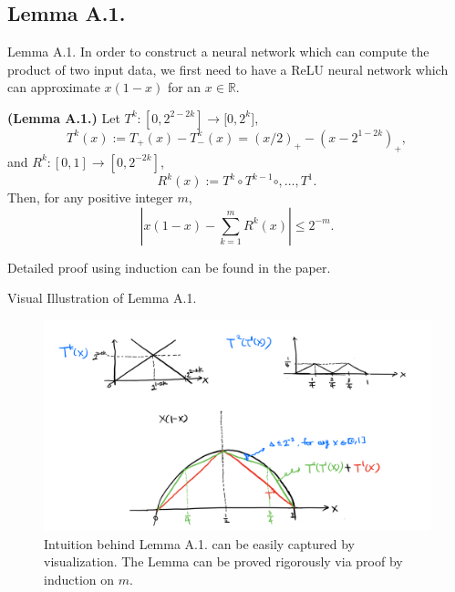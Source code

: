 \documentclass{if-beamer}
\begin{document}
\subsection{Lemma A.1.}
\begin{frame}{Lemma A.1.}
    In order to construct a neural network which can compute the product of two input data, we first need to have a ReLU neural network which can approximate $x(1-x)$ for an $x\in\mathbb{R}$.
    \begin{tcolorbox}
    \textbf{(Lemma A.1.)}
    Let $T^{k}:[0,2^{2-2k}]\rightarrow{[0,2^{k}}]$,
    \begin{equation*}
        T^{k}(x) := T_{+}(x) - T_{-}^{k}(x) = (x/2)_{+} - (x-2^{1-2k})_{+},
    \end{equation*}
    and $R^{k}:[0,1]\rightarrow{[0,2^{-2k}]}$,
    \begin{equation*}
        R^{k}(x) := T^{k}\circ T^{k-1} \circ, \dots, T^{1}.
    \end{equation*}
    Then, for any positive integer $m$,
    \begin{equation*}
        \left| x(1-x) - \sum_{k=1}^{m} R^{k}(x) \right| \leq 2^{-m}.
    \end{equation*}
    
    \end{tcolorbox}
    
    Detailed proof using induction can be found in the paper. 
\end{frame}

\begin{frame}{Visual Illustration of Lemma A.1. }

    \begin{figure}[htbp]
        \includegraphics[width=1\textwidth]{approx.png}
        \caption{ Intuition behind Lemma A.1. can be easily captured by visualization. The Lemma can be proved rigorously via proof by induction on $m$. }
        \label{fig:figure2}
    \end{figure}

\end{frame}
\end{document}
